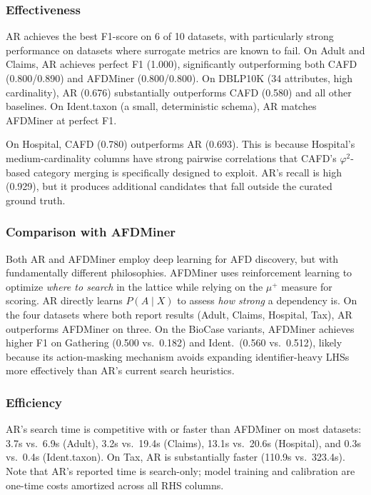 \documentclass[conference]{IEEEtran}
\begin{document}
\subsubsection{Effectiveness}
AR achieves the best F1-score on 6 of 10 datasets, with particularly strong performance on datasets where surrogate metrics are known to fail. On Adult and Claims, AR achieves perfect F1 (1.000), significantly outperforming both CAFD (0.800/0.890) and AFDMiner (0.800/0.800). On DBLP10K (34 attributes, high cardinality), AR (0.676) substantially outperforms CAFD (0.580) and all other baselines. On Ident.taxon (a small, deterministic schema), AR matches AFDMiner at perfect F1.

On Hospital, CAFD (0.780) outperforms AR (0.693). This is because Hospital's medium-cardinality columns have strong pairwise correlations that CAFD's $\varphi^2$-based category merging is specifically designed to exploit. AR's recall is high (0.929), but it produces additional candidates that fall outside the curated ground truth.

\subsubsection{Comparison with AFDMiner}
Both AR and AFDMiner employ deep learning for AFD discovery, but with fundamentally different philosophies. AFDMiner uses reinforcement learning to optimize \emph{where to search} in the lattice while relying on the $\mu^+$ measure for scoring. AR directly learns $P(A \mid X)$ to assess \emph{how strong} a dependency is. On the four datasets where both report results (Adult, Claims, Hospital, Tax), AR outperforms AFDMiner on three. On the BioCase variants, AFDMiner achieves higher F1 on Gathering (0.500 vs.\ 0.182) and Ident.\ (0.560 vs.\ 0.512), likely because its action-masking mechanism avoids expanding identifier-heavy LHSs more effectively than AR's current search heuristics.

\subsubsection{Efficiency}
AR's search time is competitive with or faster than AFDMiner on most datasets: 3.7s vs.\ 6.9s (Adult), 3.2s vs.\ 19.4s (Claims), 13.1s vs.\ 20.6s (Hospital), and 0.3s vs.\ 0.4s (Ident.taxon). On Tax, AR is substantially faster (110.9s vs.\ 323.4s). Note that AR's reported time is search-only; model training and calibration are one-time costs amortized across all RHS columns.
\end{document}
